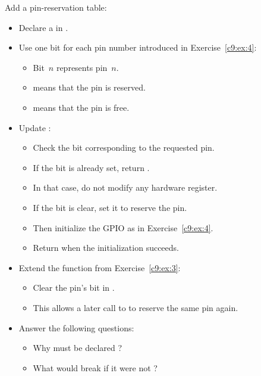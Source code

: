 \label{c9:ex:5}
Add a pin-reservation table:
\begin{itemize}
  \item Declare a  in .
  \item Use one bit for each pin number introduced in Exercise~\ref{c9:ex:4}:
  \begin{itemize}
    \item Bit~$n$ represents pin~$n$.
    \item {} means that the pin is reserved.
    \item {} means that the pin is free.
  \end{itemize}
  \item Update :
  \begin{itemize}
    \item Check the bit corresponding to the requested pin.
    \item If the bit is already set, return .
    \item In that case, do not modify any hardware register.
    \item If the bit is clear, set it to reserve the pin.
    \item Then initialize the GPIO as in Exercise~\ref{c9:ex:4}.
    \item Return  when the initialization succeeds.
  \end{itemize}
  \item Extend the  function from Exercise~\ref{c9:ex:3}:
  \begin{itemize}
    \item Clear the pin's bit in .
    \item This allows a later call to  to reserve the same pin again.
  \end{itemize}
  \item Answer the following questions:
  \begin{itemize}
    \item Why must  be declared ?
    \item What would break if it were not ?
  \end{itemize}
\end{itemize}

